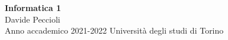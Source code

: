 \documentclass[11pt, titlepage, twoside, a4paper]{article}
\begin{document}
\begin{titlepage}
\null
\vfill
\begin{center}
{\Huge \textbf{Informatica 1}}\\
\vspace{1em}
{\large Davide Peccioli}\\
\vspace{0.6em}
{\large Anno accademico 2021-2022}
\vfill
Università degli studi di Torino
\end{center}
\end{titlepage}
{\pagestyle{empty}
\null\cleardoublepage}

\tableofcontents\cleardoublepage


\end{document}
